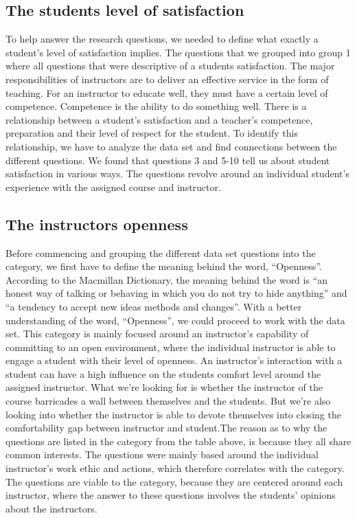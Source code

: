 \documentclass[twocolumn]{article}
\begin{document}
\subsection{The students level of satisfaction}
To help answer the research questions, we needed to define what exactly a student's level of satisfaction implies. The questions that we grouped into group 1 where all questions that were descriptive of a students satisfaction. 
The major responsibilities of instructors are to deliver an effective service in the form of teaching. For an instructor to educate well, they must have a certain level of competence. Competence is the ability to do something well.
There is a relationship between a student’s satisfaction and a teacher’s competence, preparation and their level of respect for the student. To identify this relationship, we have to analyze the data set and find connections between the different questions. We found that questions 3 and 5-10 tell us about student satisfaction in various ways. The questions revolve around an individual student’s experience with the assigned course and instructor. 

\subsection{The instructors openness}
Before commencing and grouping the different data set questions into the category, we first have to define the meaning behind the word, “Openness”. According to the Macmillan Dictionary, the meaning behind the word is “an honest way of talking or behaving in which you do not try to hide anything” and “a tendency to accept new ideas methods and changes”\cite{Macmillan}. With a better understanding of the word, “Openness”, we could proceed to work with the data set. This category is mainly focused around an instructor's capability of committing to an open environment, where the individual instructor is able to engage a student with their level of openness. An instructor's interaction with a student can have a high influence on the students comfort level around the assigned instructor. What we're looking for is whether the instructor of the course barricades a wall between themselves and the students. But we're also looking into whether the instructor is able to devote themselves into closing the comfortability gap between instructor and student.The reason as to why the questions are listed in the category from the table above, is because they all share common interests. The questions were mainly based around the individual instructor’s work ethic and actions, which therefore correlates with the category. The questions are viable to the category, because they are centered around each instructor, where the answer to these questions involves the students' opinions about the instructors.  
\end{document}
